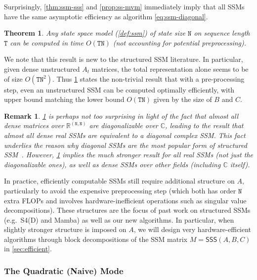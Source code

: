 \documentclass{article}
\newcommand{\citep}{\parencite}
\newtheorem{theorem}{Theorem}[section]
\newtheorem{remark}{Remark}
\newcommand{\R}{\mathbb{R}}
\begin{document}
Surprisingly, \cref{thm:ssm-sss} and \cref{prop:ss-mvm} immediately imply that all SSMs have the same asymptotic efficiency as algorithm \eqref{eq:ssm-diagonal}.
\begin{theorem}
  \label{thm:ssm-efficiency}
  Any state space model (\cref{def:ssm}) of state size $\mathtt{N}$ on sequence length $\mathtt{T}$ can be computed in time $O(\mathtt{TN})$ (not accounting for potential preprocessing).
\end{theorem}
We note that this result is new to the structured SSM literature.
In particular, given dense unstructured $A_t$ matrices, the total representation alone seems to be of size $O(\mathtt{TN}^2)$.
Thus \cref{thm:ssm-efficiency} states the non-trivial result that with a pre-processing step, even an unstructured SSM can be computed optimally efficiently,
with upper bound matching the lower bound $O(\mathtt{TN})$ given by the size of $B$ and $C$.

\begin{remark}
  \cref{thm:ssm-efficiency} is perhaps not too surprising in light of the fact that almost all dense matrices over $\R^{\mathtt{(N,N)}}$ are diagonalizable over $\mathbb{C}$,
  leading to the result that \emph{almost all} dense real SSMs are equivalent to a diagonal complex SSM.
  This fact underlies the reason why diagonal SSMs are the most popular form of structured SSM~\citep{gupta2022diagonal,gu2022parameterization,smith2023s5}.
  However, \cref{thm:ssm-efficiency} implies the much stronger result for \emph{all} real SSMs (not just the diagonalizable ones), as well as dense SSMs over other fields (including $\mathbb{C}$ itself).
\end{remark}

In practice, efficiently computable SSMs still require additional structure on $A$,
particularly to avoid the expensive preprocessing step (which both has order $\mathtt{N}$ extra FLOPs and involves hardware-inefficient operations such as singular value decompositions).
These structures are the focus of past work on structured SSMs (e.g.\ S4(D) and Mamba) as well as our new algorithms.
In particular, when slightly stronger structure is imposed on $A$, we will design very hardware-efficient algorithms through block decompositions of the SSM matrix $M = \mathsf{SSS}(A, B, C)$ in \cref{sec:efficient}.

\subsubsection{The Quadratic (Naive) Mode}
\end{document}

